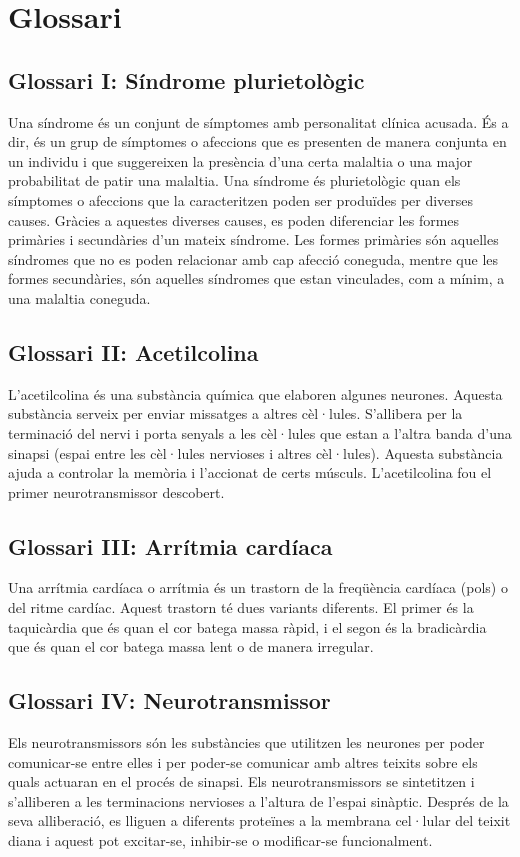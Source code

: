 \documentclass[a4paper,12pt]{report}
\begin{document}
\chapter*{Glossari}
\section*{Glossari I: Síndrome plurietològic}
Una síndrome és un conjunt de símptomes amb personalitat clínica acusada. És a dir, és un grup de símptomes o afeccions que es presenten de manera conjunta en un individu i que suggereixen la presència d'una certa malaltia o una major probabilitat de patir una malaltia. Una síndrome és plurietològic quan els símptomes o afeccions que la caracteritzen poden ser produïdes per diverses causes. Gràcies a aquestes diverses causes, es poden diferenciar les formes primàries i secundàries d'un mateix síndrome. Les formes primàries són aquelles síndromes que no es poden relacionar amb cap afecció coneguda, mentre que les formes secundàries, són aquelles síndromes que estan vinculades, com a mínim, a una malaltia coneguda.
\section*{Glossari II: Acetilcolina}
L'acetilcolina és una substància química que elaboren algunes neurones. Aquesta substància serveix per enviar missatges a altres cèl·lules. S'allibera per la terminació del nervi i porta senyals a les cèl·lules que estan a l'altra banda d'una sinapsi (espai entre les cèl·lules nervioses i altres cèl·lules). Aquesta substància ajuda a controlar la memòria i l'accionat de certs músculs. L'acetilcolina fou el primer neurotransmissor descobert.
\section*{Glossari III: Arrítmia cardíaca}
Una arrítmia cardíaca o arrítmia és un trastorn de la freqüència cardíaca (pols) o del ritme cardíac. Aquest trastorn té dues variants diferents. El primer és la taquicàrdia que és quan el cor batega massa ràpid, i el segon és la bradicàrdia que és quan el cor batega massa lent o de manera irregular.
\section*{Glossari IV: Neurotransmissor}
Els neurotransmissors són les substàncies que utilitzen les neurones per poder comunicar-se entre elles i per poder-se comunicar amb altres teixits sobre els quals actuaran en el procés de sinapsi. Els neurotransmissors se sintetitzen i s'alliberen a les terminacions nervioses a l'altura de l'espai sinàptic. Després de la seva alliberació, es lliguen a diferents proteïnes a la membrana cel·lular del teixit diana i aquest pot excitar-se, inhibir-se o modificar-se funcionalment.
\end{document}

